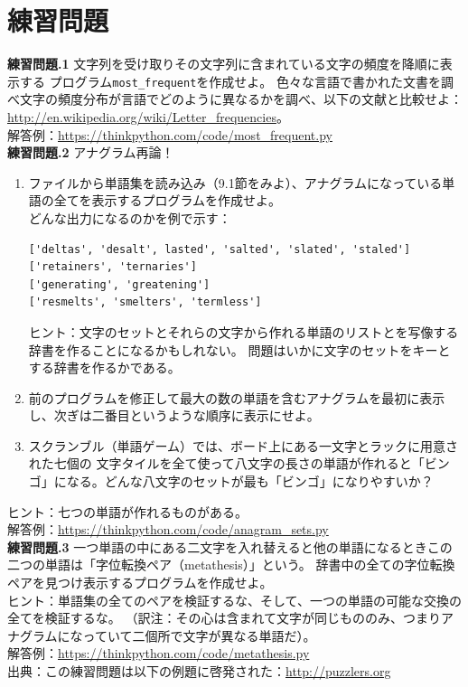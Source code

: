 \documentclass[a4j,12pt,makeidx]{jbook}
\newcommand{\tp}{\thechapter}
\begin{document}
\section{練習問題}
\noindent
{\bf 練習問題\tp.1} 文字列を受け取りその文字列に含まれている文字の頻度を降順に表示する
プログラム{\tt most\_frequent}を作成せよ。
色々な言語で書かれた文書を調べ文字の頻度分布が言語でどのように異なるかを調べ、以下の文献と比較せよ：\\
\url{http://en.wikipedia.org/wiki/Letter_frequencies}。\\
解答例：\url{https://thinkpython.com/code/most_frequent.py} \\
\noindent
{\bf 練習問題\tp.2} アナグラム再論！
\begin{enumerate}
\item ファイルから単語集を読み込み（9.1節をみよ）、アナグラムになっている単語の全てを表示するプログラムを作成せよ。\\
どんな出力になるのかを例で示す：
\begin{verbatim}
['deltas', 'desalt', lasted', 'salted', 'slated', 'staled']
['retainers', 'ternaries']
['generating', 'greatening']
['resmelts', 'smelters', 'termless']
\end{verbatim}
ヒント：文字のセットとそれらの文字から作れる単語のリストとを写像する辞書を作ることになるかもしれない。
問題はいかに文字のセットをキーとする辞書を作るかである。
\item 前のプログラムを修正して最大の数の単語を含むアナグラムを最初に表示し、次ぎは二番目というような順序に表示にせよ。
\item スクランブル（単語ゲーム）では、ボード上にある一文字とラックに用意された七個の
文字タイルを全て使って八文字の長さの単語が作れると「ビンゴ」になる。どんな八文字のセットが最も「ビンゴ」になりやすいか？
\end{enumerate}
ヒント：七つの単語が作れるものがある。 \\
解答例：\url{https://thinkpython.com/code/anagram_sets.py} \\

\noindent
{\bf 練習問題\tp.3} 一つ単語の中にある二文字を入れ替えると他の単語になるときこの二つの単語は「字位転換ペア（metathesis）」という。
辞書中の全ての字位転換ペアを見つけ表示するプログラムを作成せよ。\\
ヒント：単語集の全てのペアを検証するな、そして、一つの単語の可能な交換の全てを検証するな。
（訳注：その心は含まれて文字が同じもののみ、つまりアナグラムになっていて二個所で文字が異なる単語だ）。\\
解答例：\url{https://thinkpython.com/code/metathesis.py} \\
出典：この練習問題は以下の例題に啓発された：\url{http://puzzlers.org} \\
\end{document}
